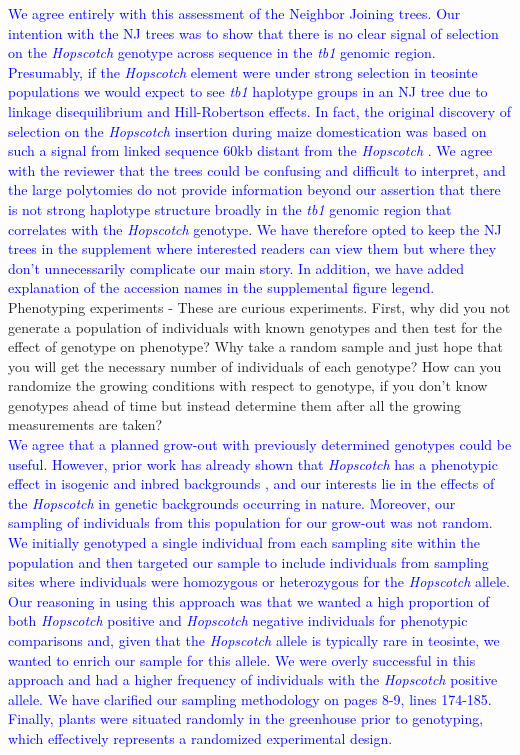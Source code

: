 \documentclass[11pt]{article}
\newcommand{\res}[1]{\noindent \textcolor{blue}{{#1}} \\}
\begin{document}
\res{We agree entirely with this assessment of the Neighbor Joining trees. 
Our intention with the NJ trees was to show that there is no clear signal of selection on the \emph{Hopscotch} genotype across sequence in the \emph{tb1} genomic region.
Presumably, if the \emph{Hopscotch} element were under strong selection in teosinte populations we would expect to see \emph{tb1} haplotype groups in an NJ tree due to linkage disequilibrium and Hill-Robertson effects.
In fact, the original discovery of selection on the \emph{Hopscotch} insertion during maize domestication was based on such a signal from linked sequence 60kb distant from the \emph{Hopscotch} \citep{Studer2011}. We agree with the reviewer that the trees could be confusing and difficult to interpret, and the large polytomies do not provide information beyond our assertion that there is not strong haplotype structure broadly in the \emph{tb1} genomic region that correlates with the \emph{Hopscotch} genotype.
We have therefore opted to keep the NJ trees in the supplement where interested readers can view them but where they don't unnecessarily complicate our main story.
In addition, we have added explanation of the accession names in the supplemental figure legend.}


Phenotyping experiments - These are curious experiments.  First, why did you not generate a population of individuals with known genotypes and then test for the effect of genotype on phenotype?  Why take a random sample and just hope that you will get the necessary number of individuals of each genotype?  How can you randomize the growing conditions with respect to genotype, if you don't know genotypes ahead of time but instead determine them after all the growing measurements are taken?\\

\res{We agree that a planned grow-out with previously determined genotypes could be useful.  
However, prior work has already shown that \emph{Hopscotch} has a phenotypic effect in isogenic and inbred backgrounds \citep{Studer2011}, and our interests lie in the effects of the \emph{Hopscotch} in genetic backgrounds occurring in nature.
Moreover, our sampling of individuals from this population for our grow-out was not random.  
We initially genotyped a single individual from each sampling site within the population and then targeted our sample to include individuals from sampling sites where individuals were homozygous or heterozygous for the \emph{Hopscotch} allele.
Our reasoning in using this approach was that we wanted a high proportion of both \emph{Hopscotch} positive and \emph{Hopscotch} negative individuals for phenotypic comparisons and, given that the \emph{Hopscotch} allele is typically rare in teosinte, we wanted to enrich our sample for this allele. 
We were overly successful in this approach and had a higher frequency of individuals with the \emph{Hopscotch} positive allele.
We have clarified our sampling methodology on pages 8-9, lines 174-185. Finally, plants were situated randomly in the greenhouse prior to genotyping, which effectively represents a randomized experimental design.}
\end{document}
